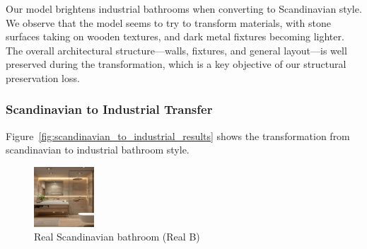 \documentclass[twocolumn,superscriptaddress,aps]{revtex4-1}
\begin{document}
Our model brightens industrial bathrooms when converting to Scandinavian style. We observe that the model seems to try to transform materials, with stone surfaces taking on wooden textures, and dark metal fixtures becoming lighter. The overall architectural structure—walls, fixtures, and general layout—is well preserved during the transformation, which is a key objective of our structural preservation loss.

\subsubsection{Scandinavian to Industrial Transfer}

Figure~\ref{fig:scandinavian_to_industrial_results} shows the transformation from scandinavian to industrial bathroom style.

\begin{figure}[h]
\centering
\includegraphics[width=0.2\textwidth]{assets/real_B.png}
\caption{Real Scandinavian bathroom (Real B)}
\label{fig:real_scandinavian}
\end{figure}
\end{document}
